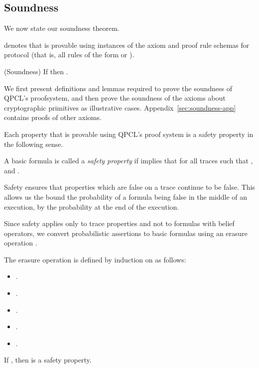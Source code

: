 \subsection{Soundness}
\label{sec:soundness}

We now state our soundness theorem.

 denotes that 
is provable using instances of the axiom and
proof rule schemas for protocol  (that is, all rules of
the form  or ).


\begin{theorem} (Soundness)
If 
then .
\end{theorem}

We first present definitions and lemmas required
to prove the soundness of QPCL's proofsystem,
and then prove the soundness of the axioms about
cryptographic primitives as illustrative cases. Appendix~\ref{sec:soundness-app} contains proofs of other axioms.


Each property that is provable using QPCL's proof system is
a safety property in the following sense.


\begin{definition}
  A basic formula  is called a \emph{safety property} if
   implies that for all traces
   such that ,  and .
\end{definition}

Safety ensures that properties which are false on a trace continue to be false.
This allows us the bound the probability of a formula being false in the
middle of an execution, by the probability at the end of the execution.

Since safety applies only to trace properties and not to formulas with belief
operators, we convert probabilistic assertions to basic formulas using an
erasure operation .

\begin{definition}[Erasure]
  The erasure operation  is defined by induction on  as follows:
      \begin{itemize}
        \item .
        \item .
        \item .
        \item .
        \item .
      \end{itemize}
\end{definition}


\begin{lemma}[Safety]
\label{lemma:safety}
If , then  is a safety property.
\end{lemma}


